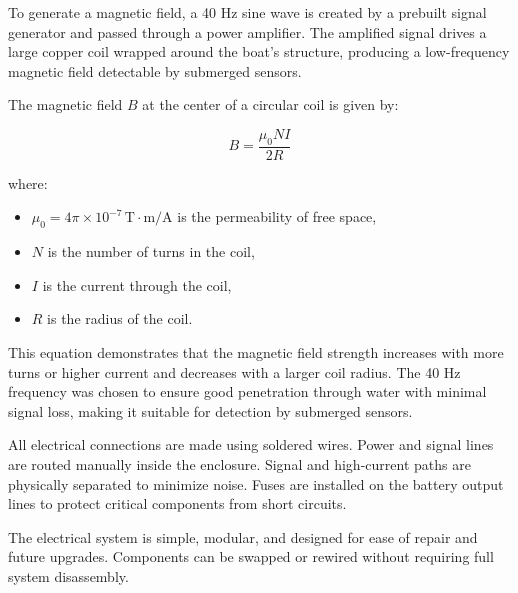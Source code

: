 To generate a magnetic field, a 40 Hz sine wave is created by a prebuilt signal generator and passed through a power amplifier. The amplified signal drives a large copper coil wrapped around the boat’s structure, producing a low-frequency magnetic field detectable by submerged sensors.

The magnetic field \( B \) at the center of a circular coil is given by:

\begin{equation}
B = \frac{\mu_0 N I}{2R}
\label{eq:bfield}
\end{equation}

where:
\begin{itemize}
    \item \( \mu_0 = 4\pi \times 10^{-7} \, \text{T}\cdot\text{m/A} \) is the permeability of free space,
    \item \( N \) is the number of turns in the coil,
    \item \( I \) is the current through the coil,
    \item \( R \) is the radius of the coil.
\end{itemize}

This equation demonstrates that the magnetic field strength increases with more turns or higher current and decreases with a larger coil radius. The 40 Hz frequency was chosen to ensure good penetration through water with minimal signal loss, making it suitable for detection by submerged sensors.

All electrical connections are made using soldered wires. Power and signal lines are routed manually inside the enclosure. Signal and high-current paths are physically separated to minimize noise. Fuses are installed on the battery output lines to protect critical components from short circuits.

The electrical system is simple, modular, and designed for ease of repair and future upgrades. Components can be swapped or rewired without requiring full system disassembly.
